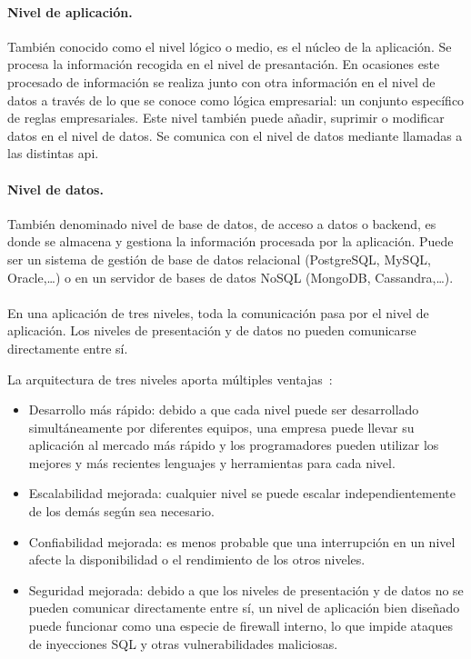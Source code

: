 \paragraph{Nivel de aplicación.} También conocido como el nivel lógico o medio, es el núcleo de la aplicación. Se procesa la información recogida en el nivel de presantación. En ocasiones este procesado de información se realiza junto con otra información en el nivel de datos a través de lo que se conoce como  lógica empresarial: un conjunto específico de reglas empresariales. Este nivel también puede añadir, suprimir o modificar datos en el nivel de datos. Se comunica con el nivel de datos mediante llamadas a las distintas \acrshort{api}. 

\paragraph{Nivel de datos.} También denominado nivel de base de datos, de acceso a datos o backend, es donde se almacena y gestiona la información procesada por la aplicación. Puede ser un sistema de gestión de base de datos relacional (PostgreSQL, MySQL, Oracle,\dots) o en un servidor de bases de datos NoSQL (MongoDB, Cassandra,\dots). 

\paragraph{}
En una aplicación de tres niveles, toda la comunicación pasa por el nivel de aplicación. Los niveles de presentación y de datos no pueden comunicarse directamente entre sí.


La arquitectura de tres niveles aporta múltiples ventajas~\cite{ibmMVC}:
\begin{itemize}
\item Desarrollo más rápido: debido a que cada nivel puede ser desarrollado simultáneamente por diferentes equipos, una empresa puede llevar su aplicación al mercado más rápido y los programadores pueden utilizar los mejores y más recientes lenguajes y herramientas para cada nivel.
\item Escalabilidad mejorada: cualquier nivel se puede escalar independientemente de los demás según sea necesario.
\item Confiabilidad mejorada: es menos probable que una interrupción en un nivel afecte la disponibilidad o el rendimiento de los otros niveles.
\item Seguridad mejorada: debido a que los niveles de presentación y de datos no se pueden comunicar directamente entre sí, un nivel de aplicación bien diseñado puede funcionar como una especie de firewall interno, lo que impide ataques de inyecciones SQL y otras vulnerabilidades maliciosas.
\end{itemize}


